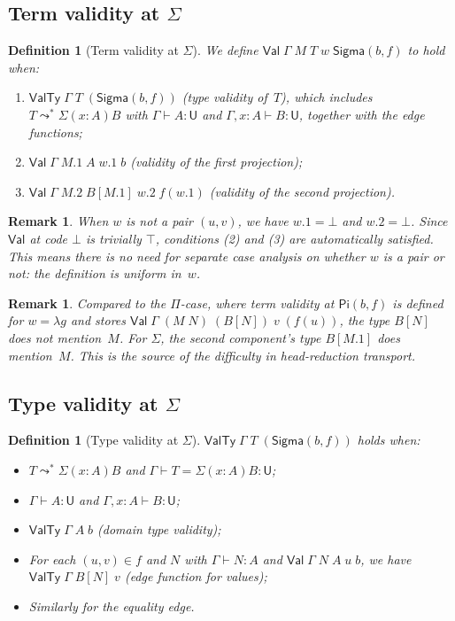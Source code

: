 \documentclass[11pt]{article}
\newcommand{\hastype}[3]{#1 \vdash #2 : #3}
\newcommand{\conveq}[4]{#1 \vdash #2 = #3 : #4}
\newcommand{\App}[2]{#1\;#2}
\newcommand{\substone}[2]{#1[#2]}
\newcommand{\U}{\mathsf{U}}
\newcommand{\PiC}[2]{\mathsf{Pi}(#1,#2)}
\newcommand{\SigmaC}[2]{\mathsf{Sigma}(#1,#2)}
\newcommand{\Red}{\mathrel{\leadsto^*}}
\newcommand{\Sigmatype}[2]{\Sigma(#1)#2}
\newcommand{\Val}{\mathsf{Val}}
\newcommand{\ValTy}{\mathsf{ValTy}}
\newcommand{\Bot}{\bot}
\newcommand{\pj}[2]{#1\mbox{.}#2}
\newtheorem{definition}[theorem]{Definition}
\newtheorem{remark}[theorem]{Remark}
\begin{document}
\subsection{Term validity at $\Sigma$}

\begin{definition}[Term validity at $\Sigma$]
We define $\Val\;\Gamma\;M\;T\;w\;\SigmaC{b}{f}$ to hold when:
\begin{enumerate}
\item $\ValTy\;\Gamma\;T\;(\SigmaC{b}{f})$ (type validity of~$T$), which
  includes $T \Red \Sigmatype{x{:}A}{B}$ with $\hastype{\Gamma}{A}{\U}$ and
  $\hastype{\Gamma, x{:}A}{B}{\U}$, together with the edge functions;
\item $\Val\;\Gamma\;\pj{M}{1}\;A\;\pj{w}{1}\;b$ (validity of the
  first projection);
\item $\Val\;\Gamma\;\pj{M}{2}\;\substone{B}{\pj{M}{1}}\;\pj{w}{2}\;f(\pj{w}{1})$
  (validity of the second projection).
\end{enumerate}
\end{definition}

\begin{remark}
When $w$ is not a pair $(u,v)$, we have $\pj{w}{1} = \Bot$ and
$\pj{w}{2} = \Bot$.  Since $\Val$ at code $\Bot$ is trivially $\top$,
conditions (2) and (3) are automatically satisfied.  This means there is no
need for separate case analysis on whether $w$ is a pair or not: the
definition is \emph{uniform} in~$w$.
\end{remark}

\begin{remark}
Compared to the $\Pi$-case, where term validity at $\PiC{b}{f}$ is
defined for $w = \lambda g$ and stores
$\Val\;\Gamma\;(\App{M}{N})\;(\substone{B}{N})\;v\;(f(u))$, the type
$\substone{B}{N}$ does not mention~$M$.  For $\Sigma$, the second
component's type $\substone{B}{\pj{M}{1}}$ \emph{does} mention~$M$.
This is the source of the difficulty in head-reduction transport.
\end{remark}

\subsection{Type validity at $\Sigma$}

\begin{definition}[Type validity at $\Sigma$]
$\ValTy\;\Gamma\;T\;(\SigmaC{b}{f})$ holds when:
\begin{itemize}
\item $T \Red \Sigmatype{x{:}A}{B}$ and
  $\conveq{\Gamma}{T}{\Sigmatype{x{:}A}{B}}{\U}$;
\item $\hastype{\Gamma}{A}{\U}$ and $\hastype{\Gamma, x{:}A}{B}{\U}$;
\item $\ValTy\;\Gamma\;A\;b$ (domain type validity);
\item For each $(u,v) \in f$ and $N$ with $\hastype{\Gamma}{N}{A}$ and
  $\Val\;\Gamma\;N\;A\;u\;b$, we have $\ValTy\;\Gamma\;\substone{B}{N}\;v$
  (edge function for values);
\item Similarly for the equality edge.
\end{itemize}
\end{definition}
\end{document}
